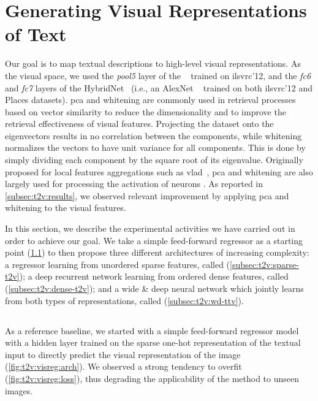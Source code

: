 \section{Generating Visual Representations of Text}
\label{sec:t2v:method}

Our goal is to map textual descriptions to high-level visual representations.
As the visual space, we used the \emph{pool5} layer of the \resnet{} ~\cite{he2016deep} trained on \gls{ilsvrc}'12, and the \emph{fc6} and \emph{fc7} layers of the HybridNet~\cite{zhou2014learning} (i.e., an AlexNet ~\cite{krizhevsky2012imagenet} trained on both \gls{ilsvrc}'12 and Places datasets).
\acrfull{pca} and whitening are commonly used in retrieval processes based on vector similarity to reduce the dimensionality and to improve the retrieval effectiveness of visual features.
Projecting the dataset onto the eigenvectors results in no correlation between the components, while
whitening normalizes the vectors to have unit variance for all components.
This is done by simply dividing each component by the square root of its eigenvalue.
Originally proposed for local features aggregations such as \gls{vlad}~\cite{jegou2012negative}, \gls{pca} and whitening are also largely used for processing the activation of neurons \cite{sharif2014cnn,gong2014multi,gordo2016deep}.
As reported in \ref{subsec:t2v:results}, we observed relevant improvement by applying \gls{pca} and whitening to the visual features.

In this section, we describe the experimental activities we have carried out in order to achieve our goal.
We take a simple feed-forward regressor as a starting point (\ref{subsec:t2v:vis-reg}) to then propose three different architectures of increasing complexity: a regressor learning from unordered sparse features, called \sparsettv{} (\ref{subsec:t2v:sparse-t2v}); a deep recurrent network learning from ordered dense features, called \densettv{} (\ref{subsec:t2v:dense-t2v}); and a wide \& deep neural network which jointly learns from both types of representations, called \widedeepttv{} (\ref{subsec:t2v:wd-ttv}).


\subsection{\visreg{}}
\label{subsec:t2v:vis-reg}

As a reference baseline, we started with a simple feed-forward regressor model with a hidden layer trained on the sparse one-hot representation of the textual input to directly predict the visual representation of the image (\ref{fig:t2v:visreg:arch}).
We observed a strong tendency to overfit (\ref{fig:t2v:visreg:loss}), thus degrading the applicability of the method to unseen images.


